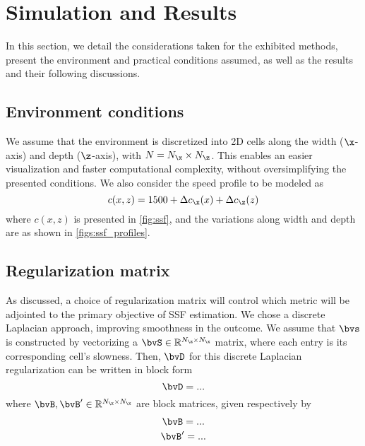 \section{Simulation and Results}
\label{sec:simulation_and_results}

In this section, we detail the considerations taken for the exhibited methods, present the environment and practical conditions assumed, as well as the results and their following discussions.

\subsection{Environment conditions}

We assume that the environment is discretized into 2D cells along the width ($\x$-axis) and depth ($\z$-axis), with $N = N_{\x} \times N_{\z}$. This enables an easier visualization and faster computational complexity, without oversimplifying the presented conditions. We also consider the speed profile to be modeled as
\begin{equation}
	c(x,z) = 1500 + \Delta c_{\x}(x) + \Delta c_{\z}(z)
\end{equation}
where $c(x,z)$ is presented in \cref{fig:ssf}, and the variations along width and depth are as shown in \cref{figs:ssf_profiles}.

\subsection{Regularization matrix}

As discussed, a choice of regularization matrix will control which metric will be adjointed to the primary objective of SSF estimation. We chose a discrete Laplacian approach, improving smoothness in the outcome. We assume that $\bvs$ is constructed by vectorizing a $\bvS \in \re^{\sz{N_{\z}}{N_{\x}}}$ matrix, where each entry is its corresponding cell's slowness. Then, $\bvD$ for this discrete Laplacian regularization can be written in block form
\begin{equation}
	\bvD = ...
\end{equation}
where $\bvB,\bvB' \in \re^{\sz{N_{\x}}{N_{\x}}}$ are block matrices, given respectively by
\begin{subequations}
	\begin{gather}
		\bvB = ...\\
		\bvB' = ...
	\end{gather}
\end{subequations}

